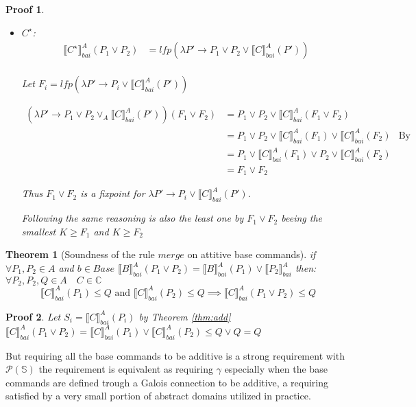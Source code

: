 \documentclass{article}
\newtheorem{theorem}{Theorem}
\newtheorem{proofs}{Proof}
\def\rr{\rightarrow}
\newcommand*{\sem}[1]{
    \llbracket #1 \rrbracket
}
\newcommand{\bca}[2]{
    #2_{bai}^{#1}
}
\newcommand{\bsem}[2][A]{
    \bca{#1}{\sem{#2}}
}
\def\rr{\rightarrow}
\def\lang{\mathbb{C}}
\def\state{\mathbb{S}}
\def\pow{\mathcal{P}}
\begin{document}
\begin{proofs}
\begin{itemize}
            \item $C^\star$:
                \begin{align*}
                    \bsem{C^\star}(P_1 \lor P_2)
                        &= lfp(\lambda P' \rr P_1 \lor P_2 \lor \bsem{C}(P')) \\
                \end{align*}

                Let $F_i = lfp(\lambda P' \rr P_i \lor \bsem{C}(P'))$


                \begin{align*}
                    (\lambda P' \rr P_1 \vee P_2 \vee_A \bsem{C}(P'))(F_1 \lor F_2)
                        &= P_1 \vee P_2 \vee \bsem{C}(F_1 \vee F_2) \\
                        &= P_1 \vee P_2 \vee \bsem{C}(F_1) \vee \bsem{C}(F_2)
                        & \text{By inductive hypothesis}  \\
                        &= P_1 \vee \bsem{C}(F_1) \vee P_2 \vee \bsem{C}(F_2) \\
                        &= F_1 \lor F_2
                \end{align*}

                Thus $F_1 \lor F_2$ is a fixpoint for 
                $\lambda P' \rr P_i \lor \bsem{C}(P')$.

                Following the same reasoning is also the least one by 
                $F_1 \lor F_2$ beeing the smallest $K \geq F_1$ and 
                $K \geq F_2$
        \end{itemize}
    \end{proofs}

    \begin{theorem}[Soundness of the rule $merge$ on attitive base commands]
        if $\forall P_1, P_2 \in A$ and $b \in Base$ $\bsem{B}(P_1 \lor P_2)
        = \bsem{B}(P_1) \lor \bsem{P_2}$ then:
        $\forall P_2, P_2, Q \in A \quad C \in \lang$
        $$\bsem{C}(P_1) \leq Q \text{ and } \bsem{C}(P_2) \leq Q \implies
        \bsem{C}(P_1 \lor P_2) \leq Q$$
    \end{theorem}
    \begin{proofs}
        Let $S_i = \bsem{C}(P_i)$ by Theorem \ref{thm:add} 
        $\bsem{C}(P_1 \lor P_2) = \bsem{C}(P_1) \vee \bsem{C}(P_2) \leq Q \lor Q
        = Q$
    \end{proofs}

    But requiring all the base commands to be additive is a strong requirement
    with $\pow(\state)$ the requirement is equivalent as requiring $\gamma$ 
    especially when the base commands are defined trough a Galois connection
    to be additive, a requiring satisfied by a very small portion of abstract
    domains utilized in practice.
\end{document}
